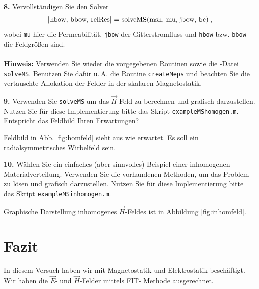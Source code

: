 \documentclass[Protokollheft.tex]{subfiles}
\begin{document}
\begin{framed}
	\noindent \textbf{8.} Vervollständigen Sie den Solver
\begin{align}
\lstinline{[hbow, bbow, relRes] = solveMS(msh, mu, jbow, bc)} \; ,
\end{align}
wobei \lstinline{mu} hier die Permeabilität, \lstinline{jbow} der Gitterstromfluss und
\lstinline{hbow} bzw. \lstinline{bbow} die Feldgrößen sind.\\
\ \\
{\textbf{Hinweis:}} Verwenden Sie wieder die vorgegebenen Routinen sowie die \matlab-Datei \lstinline{solveMS}. Benutzen Sie
dafür u.\,A. die Routine \lstinline{createMeps} und beachten Sie die vertauschte Allokation der Felder in der skalaren Magnetostatik.\label{exer:solveMS}
\end{framed}



\begin{framed}
	\noindent \textbf{9.} Verwenden Sie \lstinline{solveMS} um das $\vec{H}$-Feld zu berechnen und grafisch darzustellen. Nutzen Sie für diese Implementierung bitte das Skript \lstinline{exampleMShomogen.m}. Entspricht das Feldbild Ihren Erwartungen?\label{exer:visualizeHfield}
\end{framed}

Feldbild in Abb. \ref{fig:homfeld} sieht aus wie erwartet. Es soll ein radialsymmetrisches Wirbelfeld sein.

\begin{framed}
	\noindent \textbf{10.} Wählen Sie ein einfaches (aber sinnvolles) Beispiel einer inhomogenen Materialverteilung. Verwenden Sie die vorhandenen Methoden, um das
Problem zu lösen und grafisch darzustellen. Nutzen Sie für diese Implementierung bitte das Skript \lstinline{exampleMSinhomogen.m}.\label{exer:Hfield4inhomogenMaterial}
\end{framed}

Graphische Darstellung inhomogenes $\vec{H}$-Feldes ist in Abbildung \ref{fig:inhomfeld}.



\section{Fazit}
In diesem Versuch haben wir mit Magnetostatik und Elektrostatik beschäftigt. Wir haben die $\vec{E}$- und $\vec{H}$-Felder mittels FIT- Methode ausgerechnet. 

\clearpage
\newpage
\end{document}
